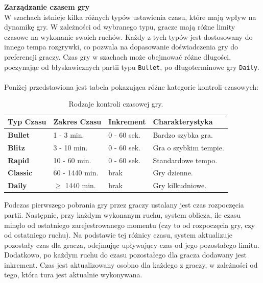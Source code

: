 \documentclass[12pt,a4paper]{article}
\begin{document}
\newpage

\noindent \textbf{Zarządzanie czasem gry}\\
W szachach istnieje kilka różnych typów ustawienia czasu, które mają wpływ na dynamikę gry. W zależności od wybranego typu, gracze mają różne limity czasowe na wykonanie swoich ruchów. Każdy z tych typów jest dostosowany do innego tempa rozgrywki, co pozwala na dopasowanie doświadczenia gry do preferencji graczy. Czas gry w szachach może obejmować różne długości, poczynając od błyskawicznych partii typu \texttt{Bullet}, po długoterminowe gry \texttt{Daily}.
\\\\
Poniżej przedstawiona jest tabela pokazująca różne kategorie kontroli czasowych:

\renewcommand{\arraystretch}{1.5}
\begin{table}[h!]
    \centering
    \begin{tabular}{|l|m{3cm}|m{3cm}|m{5cm}|}
        \hline
        \rowcolor{lightgray}
        \textbf{Typ Czasu} & \textbf{Zakres Czasu} & \textbf{Inkrement} & \textbf{Charakterystyka} \\ \hline
        \textbf{Bullet} & 1 - 3 min. & 0 - 60 sek. & Bardzo szybka gra. \\ \hline
        \textbf{Blitz} & 3 - 10 min. & 0 - 60 sek. & Gra o szybkim tempie. \\ \hline
        \textbf{Rapid} & 10 - 60 min. & 0 - 60 sek. & Standardowe tempo. \\ \hline
        \textbf{Classic} & 60 - 1440 min. & brak & Gry dzienne. \\ \hline
        \textbf{Daily} & $\geq$ 1440 min. & brak & Gry kilkudniowe. \\ \hline
    \end{tabular}
    \caption{Rodzaje kontroli czasowej gry.}
\end{table}
\vspace{0.5cm}

\noindent
Podczas pierwszego pobrania gry przez graczy ustalany jest czas rozpoczęcia partii. Następnie, przy każdym wykonanym ruchu, system oblicza, ile czasu minęło od ostatniego zarejestrowanego momentu (czy to od rozpoczęcia gry, czy od ostatniego ruchu). Na podstawie tej różnicy czasu, system aktualizuje pozostały czas dla gracza, odejmując upływający czas od jego pozostałego limitu. Dodatkowo, po każdym ruchu do czasu pozostałego dla gracza dodawany jest inkrement. Czas jest aktualizowany osobno dla każdego z graczy, w zależności od tego, która tura jest aktualnie wykonywana.
\end{document}
